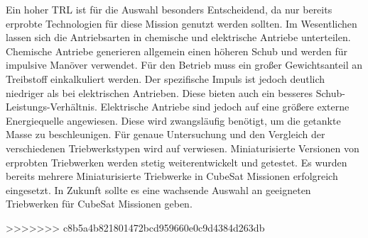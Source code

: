 Ein hoher TRL ist für die Auswahl besonders Entscheidend, da nur bereits erprobte Technologien für diese Mission genutzt werden sollten.
Im Wesentlichen lassen sich die Antriebsarten in chemische und elektrische Antriebe unterteilen.  Chemische Antriebe generieren allgemein einen höheren Schub und werden für impulsive Manöver verwendet. Für den Betrieb muss ein großer Gewichtsanteil an Treibstoff einkalkuliert werden. Der spezifische Impuls ist jedoch deutlich niedriger als bei elektrischen Antrieben. Diese bieten auch ein besseres Schub-Leistungs-Verhältnis. Elektrische Antriebe sind jedoch auf eine größere externe Energiequelle angewiesen. Diese wird zwangsläufig benötigt, um die getankte Masse zu beschleunigen. \cite{Lettau.}
Für genaue Untersuchung und den Vergleich der verschiedenen Triebwerkstypen wird auf \cite{Lettau.} verwiesen. Miniaturisierte Versionen von erprobten Triebwerken werden stetig weiterentwickelt und getestet. Es wurden bereits mehrere Miniaturisierte Triebwerke in CubeSat Missionen erfolgreich eingesetzt. In Zukunft sollte es eine wachsende Auswahl an geeigneten Triebwerken für CubeSat Missionen geben. 

>>>>>>> c8b5a4b821801472bcd959660e0c9d4384d263db
